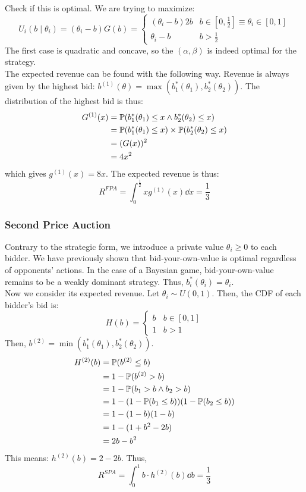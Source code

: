 Check if this is optimal. We are trying to maximize:
$$U_i(b \mid \theta_i) = (\theta_i - b)G(b) = \begin{cases}
    (\theta_i - b)2b & b \in [0, \frac{1}{2}] \equiv \theta_i \in [0, 1] \\
    \theta_i - b & b > \frac{1}{2}
\end{cases}$$
The first case is quadratic and concave, so the $(\alpha, \beta)$ is indeed optimal for the strategy. \\
The expected revenue can be found with the following way. Revenue is always given by the highest bid: $b^{(1)}(\theta) = \max(b_1^*(\theta_1), b_2^*(\theta_2))$. The distribution of the highest bid is thus:
\begin{align*}
    G^{(1)}(x) &= \mathbb{P}(b_1^*(\theta_1) \le x \land b_2^*(\theta_2) \le x) \\
    &= \mathbb{P}(b_1^*(\theta_1) \le x) \times \mathbb{P}(b_2^*(\theta_2) \le x) \\
    &= (G(x))^2 \\
    &= 4x^2
\end{align*}
which gives $g^{(1)}(x) = 8x$. The expected revenue is thus:
$$R^{FPA} = \int_{0}^{\frac{1}{2}} x g^{(1)}(x) \dd x = \frac{1}{3}$$

\subsubsection{Second Price Auction}
Contrary to the strategic form, we introduce a private value $\theta_i \ge 0$ to each bidder. We have previously shown that bid-your-own-value is optimal regardless of opponents' actions. In the case of a Bayesian game, bid-your-own-value remains to be a weakly dominant strategy. Thus, $b_i^*(\theta_i) = \theta_i$. \\
Now we consider its expected revenue. Let $\theta_i \sim U(0, 1)$. Then, the CDF of each bidder's bid is:
$$H(b) = \begin{cases}
    b & b \in [0, 1] \\
    1 & b > 1
\end{cases}$$
Then, $b^{(2)} = \min(b_1^*(\theta_1), b_2^*(\theta_2))$.
\begin{align*}
    H^{(2)}(b) &= \mathbb{P}(b^{(2)} \le b) \\
    &= 1 - \mathbb{P}(b^{(2)} > b) \\
    &= 1 - \mathbb{P}(b_1 > b \land b_2 > b) \\
    &= 1 - (1 - \mathbb{P}(b_1 \le b))(1 - \mathbb{P}(b_2 \le b)) \\
    &= 1 - (1 - b)(1 - b) \\
    &= 1 - (1 + b^2 - 2b) \\\
    &= 2b - b^2
\end{align*}
This means: $h^{(2)}(b) = 2-2b$. Thus,
$$R^{SPA} = \int_{0}^{1} b \cdot h^{(2)}(b) \dd b = \frac{1}{3}$$

